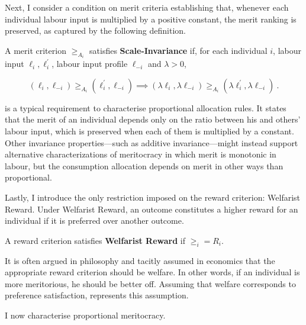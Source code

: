 Next, I consider a condition on merit criteria establishing that, whenever each individual labour input is multiplied by a positive constant, the merit ranking is preserved, as captured by the following definition.

\begin{definition}
	\label{def:scale}
	A merit criterion \( \geq_{A_i} \) satisfies \textbf{Scale-Invariance} if, for each individual \( i \), labour input \( \ell_i, \ell^{\prime}_{i} \), labour input profile \( \ell_{-i} \) and \( \lambda > 0 \),

	\[ ( \ell_i, \ell_{-i} ) \geq_{A_i} ( \ell^{\prime}_i, \ell_{-i} ) \implies ( \lambda \ell_i, \lambda \ell_{-i} ) \geq_{A_i} ( \lambda \ell^{\prime}_i, \lambda \ell_{-i} ) \: .\]
\end{definition}

 is a typical requirement to characterise proportional allocation rules. It states that the merit of an individual depends only on the ratio between his and others' labour input, which is preserved when each of them is multiplied by a constant. Other invariance properties—such as additive invariance—might instead support alternative characterizations of meritocracy in which merit is monotonic in labour, but the consumption allocation depends on merit in other ways than proportional.

Lastly, I introduce the only restriction imposed on the reward criterion: Welfarist Reward. Under Welfarist Reward, an outcome constitutes a higher reward for an individual if it is preferred over another outcome.

\begin{definition}\label{def:welfrew}
	A reward criterion satisfies \textbf{Welfarist Reward} if \( \geq_i = R_i \).
\end{definition}

It is often argued in philosophy \citep{arnesonDesertEquality2007,kaganGeometryDesert2014} and tacitly assumed in economics that the appropriate reward criterion should be welfare. In other words, if an individual is more meritorious, he should be better off. Assuming that welfare corresponds to preference satisfaction,  represents this assumption.

I now characterise proportional meritocracy.

